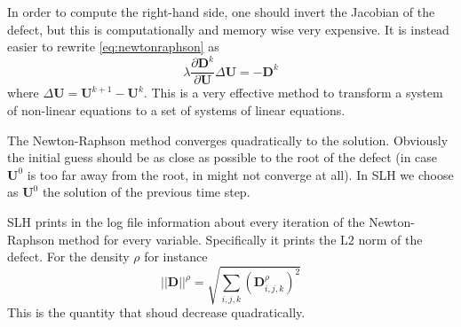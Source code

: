 In order to compute the right-hand side, one should invert the Jacobian of the defect, but this is computationally and memory wise very expensive. It is instead easier to rewrite \ref{eq:newtonraphson} as 
\begin{equation}
	\lambda \frac{\partial \mathbf{D}^k}{\partial \mathbf{U}} \Delta \mathbf{U} = - \mathbf{D}^k
\end{equation}
where $\Delta \mathbf{U}=\mathbf{U}^{k+1} - \mathbf{U}^k$. This is a very effective method to transform a system of non-linear equations to a set of systems of linear equations.

The Newton-Raphson method converges quadratically to the solution. Obviously the initial guess should be as close as possible to the root of the defect (in case $\mathbf{U}^0$ is too far away from the root, in might not converge at all). In SLH we choose as $\mathbf{U}^0$ the solution of the previous time step.

SLH prints in the log file information about every iteration of the Newton-Raphson method for every variable. Specifically it prints the $\mathrm{L2}$ norm of the defect. For the density $\rho$ for instance
\begin{equation}\label{eq:l2defect}
	||\mathbf{D}||^{\rho} = \sqrt{ \sum_{i, j, k} \left( \mathbf{D}^{\rho}_{i, j, k}  \right)^2}
\end{equation}
This is the quantity that shoud decrease quadratically.
